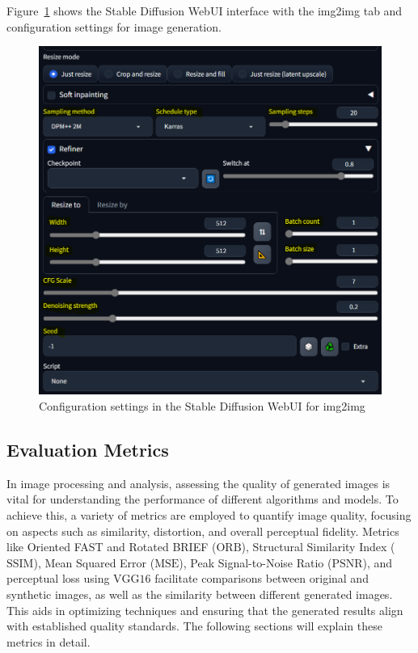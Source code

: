 \documentclass[12pt,DIV14,BCOR12mm,a4paper,footinclude=false,headinclude,parskip=half-,twoside,openright,cleardoublepage=empty,toc=index,bibliography=totoc,listof=totoc]{scrreprt}
\numberwithin{equation}{chapter}
\begin{document}
Figure~\ref{fig:webui_screenshot} shows the Stable Diffusion WebUI interface with the img2img tab and configuration settings for image generation.
\begin{figure}
	\centering
	\includegraphics[scale=.6]{../media/stable_diffusion_webui.PNG}
	\caption{Configuration settings in the Stable Diffusion WebUI for img2img}
	\label{fig:webui_screenshot}
\end{figure}
		
\subsection{Evaluation Metrics}
In image processing and analysis, assessing the quality of generated images is vital for understanding the performance of different algorithms and models. To achieve this, a variety of metrics are employed to quantify image quality, focusing on aspects such as similarity, distortion, and overall perceptual fidelity. Metrics like Oriented FAST and Rotated BRIEF ($\text{ORB}$), Structural Similarity Index ($\text{SSIM}$), Mean Squared Error ($\text{MSE}$), Peak Signal-to-Noise Ratio ($\text{PSNR}$), and perceptual loss using $\text{VGG16}$ facilitate comparisons between original and synthetic images, as well as the similarity between different generated images. This aids in optimizing techniques and ensuring that the generated results align with established quality standards. The following sections will explain these metrics in detail.
\end{document}
